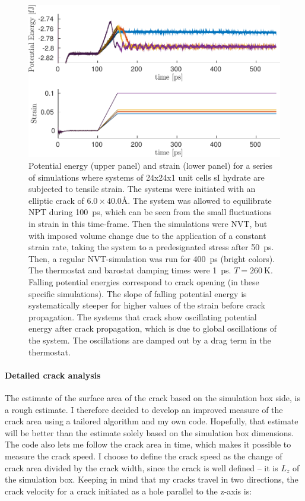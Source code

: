 \begin{figure}
\includegraphics[width=\textwidth]{../figures/thesis/proof_of_concept_poteng_strain.pdf}
\caption{Potential energy (upper panel) and strain (lower panel) for a series of simulations where systems of 24x24x1 unit cells sI hydrate are subjected to tensile strain. The systems were initiated with an elliptic crack of $6.0 \times 40.0 \si{\angstrom}$. The system was allowed to equilibrate NPT during \SI{100}{\pico\second}, which can be seen from the small fluctuations in strain in this time-frame. Then the simulations were NVT, but with imposed volume change due to the application of a constant strain rate, taking the system to a predesignated stress after \SI{50}{\pico\second}. Then, a regular NVT-simulation was run for \SI{400}{\pico\second} (bright colors). The thermostat and barostat damping times were \SI{1}{\pico\second}. $T=\SI{260}{\kelvin}$. Falling potential energies correspond to crack opening (in these specific simulations). The slope of falling potential energy is systematically steeper for higher values of the strain before crack propagation. The systems that crack show oscillating potential energy after crack propagation, which is due to global oscillations of the system. The oscillations are damped out by a drag term in the thermostat. }
\label{fig:proof_of_concept_crack}
\end{figure}

\paragraph{Detailed crack analysis}
The estimate of the surface area of the crack based on the simulation box side, is a rough estimate. I therefore decided to develop an improved measure of the crack area using a tailored algorithm and my own code. Hopefully, that estimate will be better than the estimate solely based on the simulation box dimensions. The code also lets me follow the crack area in time, which makes it possible to measure the crack speed. I choose to define the crack speed as the change of crack area divided by the crack width, since the crack is well defined -- it is $L_z$ of the simulation box. Keeping in mind that my cracks travel in two directions, the crack velocity for a crack initiated as a hole parallel to the z-axis is:

